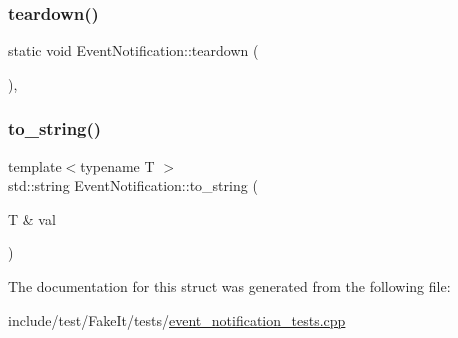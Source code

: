 \subsubsection{\texorpdfstring{teardown()}{teardown()}}
{\footnotesize\ttfamily static void Event\+Notification\+::teardown (\begin{DoxyParamCaption}{ }\end{DoxyParamCaption})\hspace{0.3cm}{\ttfamily [inline]}, {\ttfamily [static]}}

\mbox{\label{structEventNotification_a89f133025fca462e6316a6b242b408f6}} 
\subsubsection{\texorpdfstring{to\_string()}{to\_string()}}
{\footnotesize\ttfamily template$<$typename T $>$ \\
std\+::string Event\+Notification\+::to\+\_\+string (\begin{DoxyParamCaption}\item[{T \&}]{val }\end{DoxyParamCaption})\hspace{0.3cm}{\ttfamily [inline]}}



The documentation for this struct was generated from the following file\+:\begin{DoxyCompactItemize}
\item 
include/test/\+Fake\+It/tests/\mbox{\hyperlink{event__notification__tests_8cpp}{event\+\_\+notification\+\_\+tests.\+cpp}}\end{DoxyCompactItemize}
